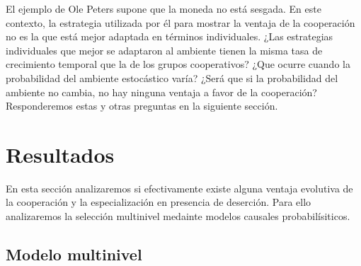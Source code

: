 \documentclass[a4paper,10pt]{article}
\begin{document}

El ejemplo de Ole Peters supone que la moneda no está sesgada.
En este contexto, la estrategia utilizada por él para mostrar la ventaja de la cooperación no es la que está mejor adaptada en términos individuales.
¿Las estrategias individuales que mejor se adaptaron al ambiente tienen la misma tasa de crecimiento temporal que la de los grupos cooperativos?
¿Que ocurre cuando la probabilidad del ambiente estocástico varía? 
¿Será que si la probabilidad del ambiente no cambia, no hay ninguna ventaja a favor de la cooperación?
Responderemos estas y otras preguntas en la siguiente sección.

\section{Resultados}


En esta sección analizaremos si efectivamente existe alguna ventaja evolutiva de la cooperación y la especialización en presencia de deserción.
Para ello analizaremos la selección multinivel medainte modelos causales probabilísiticos.


\subsection{Modelo multinivel}
\end{document}
